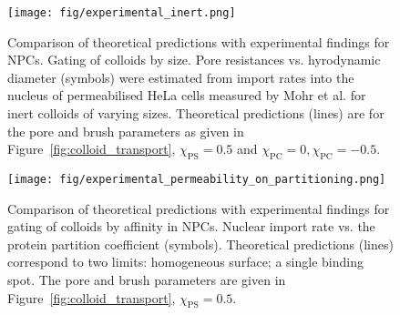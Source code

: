\documentclass[12pt, a4paper]{article}
\begin{document}

\begin{figure}
    \centering
    \texttt{[image: fig/experimental\_inert.png]}
    \caption{
    Comparison of theoretical predictions with experimental findings for NPCs. Gating of colloids by size.
    Pore resistances vs. hyrodynamic diameter (symbols) were estimated from import rates into the nucleus of permeabilised HeLa cells measured by Mohr et al. for inert colloids of varying sizes.
    Theoretical predictions (lines) are for the pore and brush parameters as given in Figure~\ref{fig:colloid_transport}, $\chi_{\text{PS}} = 0.5$ and $\chi_{\text{PC}} = 0, \chi_{\text{PC}} = -0.5$.
    }
    \label{fig:NPC_comparison}
\end{figure}

\begin{figure}
    \centering
    \texttt{[image: fig/experimental\_permeability\_on\_partitioning.png]}
    \caption{
    Comparison of theoretical predictions with experimental findings for gating of colloids by affinity in NPCs.
    Nuclear import rate vs. the protein partition coefficient (symbols).
    Theoretical predictions (lines) correspond to two limits: homogeneous surface; a single binding spot. The pore and brush parameters are given in Figure~\ref{fig:colloid_transport}, $\chi_{\text{PS}} = 0.5$.
    }
    \label{fig:NPC_attr_comparison}
\end{figure}
\end{document}
